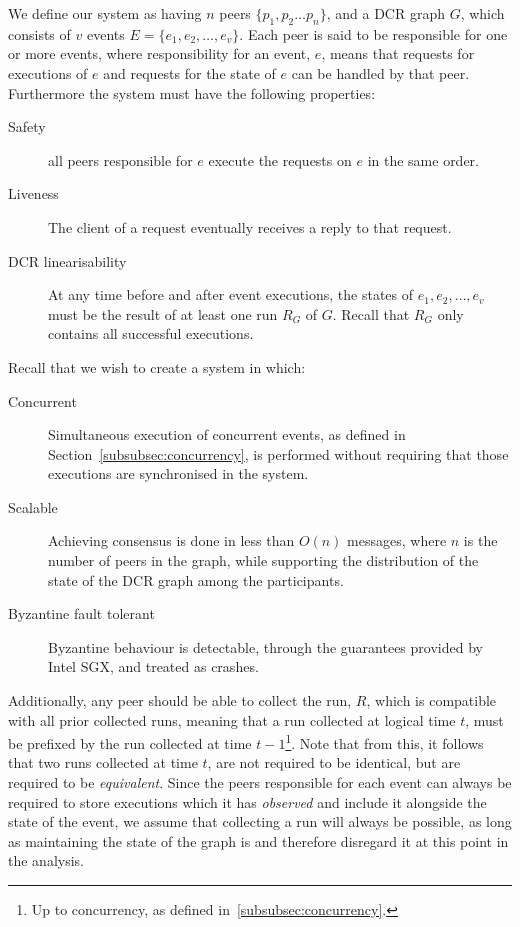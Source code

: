 \documentclass{article}
\begin{document}
	We define our system as having $n$ peers $\{p_1, p_2 \dots p_n\}$, and a DCR graph $G$, which consists of $v$ events $E = \{e_1, e_2, \dots, e_v\}$.
	Each peer is said to be responsible for one or more events, where responsibility for an event, $e$, means that requests for executions of $e$ and requests for the state of $e$ can be handled by that peer.
	Furthermore the system must have the following properties:
	\begin{description}
		\item[Safety] all peers responsible for $e$ execute the requests on $e$ in the same order.
		\item[Liveness] The client of a request eventually receives a reply to that request.
		\item[DCR linearisability] At any time before and after event executions, the states of $e_1, e_2, \dots, e_v$ must be the result of at least one run $R_G$ of $G$. Recall that $R_G$ only contains all successful executions.
	\end{description}

    Recall that we wish to create a system in which:
    \begin{description}
        \item[Concurrent] Simultaneous execution of concurrent events, as defined in Section~\ref{subsubsec:concurrency}, is performed without requiring that those executions are synchronised in the system.
        \item[Scalable] Achieving consensus is done in less than $O(n)$ messages, where $n$ is the number of peers in the graph, while supporting the distribution of the state of the DCR graph among the participants.
        \item[Byzantine fault tolerant] Byzantine behaviour is detectable, through the guarantees provided by Intel SGX, and treated as crashes.
    \end{description}

	 Additionally, any peer should be able to collect the run, $R$, which is compatible with all prior collected runs, meaning that a run collected at logical time $t$, must be prefixed by the run collected at time $t-1$\footnote{Up to concurrency, as defined in~\ref{subsubsec:concurrency}.}.
     Note that from this, it follows that two runs collected at time $t$, are not required to be identical, but are required to be \textit{equivalent}.
     Since the peers responsible for each event can always be required to store executions which it has \textit{observed} and include it alongside the state of the event, we assume that collecting a run will always be possible, as long as maintaining the state of the graph is and therefore disregard it at this point in the analysis.
\end{document}
